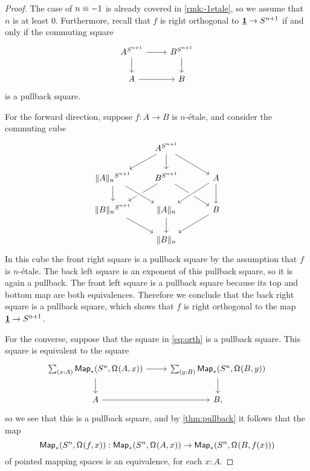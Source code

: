 \documentclass[9pt,twosided]{amsart}
\begin{document}
\begin{proof}
  The case of $n\equiv -1$ is already covered in \cref{rmk:-1etale}, so we assume that $n$ is at least $0$. Furthermore, recall that $f$ is right orthogonal to $\underline{\mathbf{1}}\to S^{n+1}$ if and only if the commuting square
    \begin{equation}\label{eq:orth}
      \begin{tikzcd}
        A^{\sphere{n+1}} \arrow[r] \arrow[d] & B^{\sphere{n+1}} \arrow[d] \\
        A \arrow[r] & B
      \end{tikzcd}
    \end{equation}
    is a pullback square.

  For the forward direction, suppose $f:A\to B$ is $n$-\'etale, and consider the commuting cube
\begin{equation*}
\begin{tikzcd}
&[-1ex] A^{\sphere{n+1}} \arrow[dl] \arrow[d] \arrow[dr] &[2ex] \\
\trunc{n}{A}^{\sphere{n+1}} \arrow[d] & B^{\sphere{n+1}} \arrow[dl] \arrow[dr] & A \arrow[dl,crossing over] \arrow[d] \\
\trunc{n}{B}^{\sphere{n+1}} \arrow[dr] & \trunc{n}{A} \arrow[d] \arrow[from=ul,crossing over] & B \arrow[dl] \\
& \trunc{n}{B}
\end{tikzcd}
\end{equation*}
In this cube the front right square is a pullback square by the assumption that $f$ is $n$-\'etale. The back left square is an exponent of this pullback square, so it is again a pullback. The front left square is a pullback square because its top and bottom map are both equivalences. Therefore we conclude that the back right square is a pullback square, which shows that $f$ is right orthogonal to the map $\underline{\mathbf{1}}\to S^{n+1}$.

  For the converse, suppose that the square in \cref{eq:orth} is a pullback square. This square is equivalent to the square
  \begin{equation*}
    \begin{tikzcd}
      \sm{x:A}\mathsf{Map}_\ast(\sphere{n},\loopspace{A,x}) \arrow[r] \arrow[d] & \sm{y:B} \mathsf{Map}_\ast(\sphere{n},\loopspace{B,y}) \arrow[d] \\
      A \arrow[r] & B,
    \end{tikzcd}
  \end{equation*}
  so we see that this is a pullback square, and by \cref{thm:pullback} it follows that the map
  \begin{equation*}
    \mathsf{Map}_\ast(S^{n},\mathsf{\Omega}^{}(f,x)):\mathsf{Map}_\ast(S^{n},\mathsf{\Omega}^{}(A,x)) \to \mathsf{Map}_\ast(S^{n},\mathsf{\Omega}^{}(B,f(x)))
  \end{equation*}
  of pointed mapping spaces is an equivalence, for each $x:A$.


\end{proof}
\end{document}
